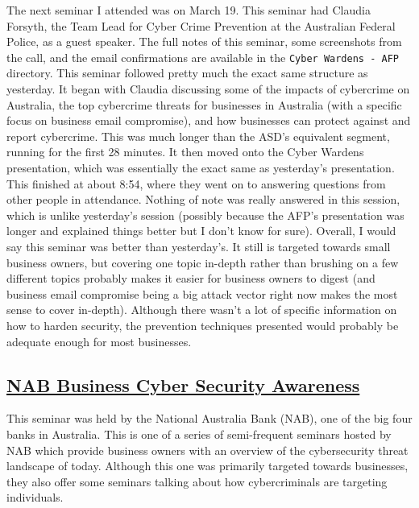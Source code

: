 The next seminar I attended was on March 19. This seminar had Claudia
Forsyth, the Team Lead for Cyber Crime Prevention at the Australian
Federal Police, as a guest speaker. The full notes of this seminar, some
screenshots from the call, and the email confirmations are available in
the \texttt{Cyber\ Wardens\ -\ AFP} directory. This seminar followed
pretty much the exact same structure as yesterday. It began with Claudia
discussing some of the impacts of cybercrime on Australia, the top
cybercrime threats for businesses in Australia (with a specific focus on
business email compromise), and how businesses can protect against and
report cybercrime. This was much longer than the ASD's equivalent
segment, running for the first 28 minutes. It then moved onto the Cyber
Wardens presentation, which was essentially the exact same as
yesterday's presentation. This finished at about 8:54, where they went
on to answering questions from other people in attendance. Nothing of
note was really answered in this session, which is unlike yesterday's
session (possibly because the AFP's presentation was longer and
explained things better but I don't know for sure). Overall, I would say
this seminar was better than yesterday's. It still is targeted towards
small business owners, but covering one topic in-depth rather than
brushing on a few different topics probably makes it easier for business
owners to digest (and business email compromise being a big attack
vector right now makes the most sense to cover in-depth). Although there
wasn't a lot of specific information on how to harden security, the
prevention techniques presented would probably be adequate enough for
most businesses.

\hypertarget{nab-business-cyber-security-awareness}{%
\subsection{\texorpdfstring{\href{https://www.nab.com.au/about-us/security/online-safety-tips-business/security-awareness-presentations}{NAB
Business Cyber Security
Awareness}}{NAB Business Cyber Security Awareness}}\label{nab-business-cyber-security-awareness}}

This seminar was held by the National Australia Bank (NAB), one of the
big four banks in Australia. This is one of a series of semi-frequent
seminars hosted by NAB which provide business owners with an overview of
the cybersecurity threat landscape of today. Although this one was
primarily targeted towards businesses, they also offer some seminars
talking about how cybercriminals are targeting individuals.

